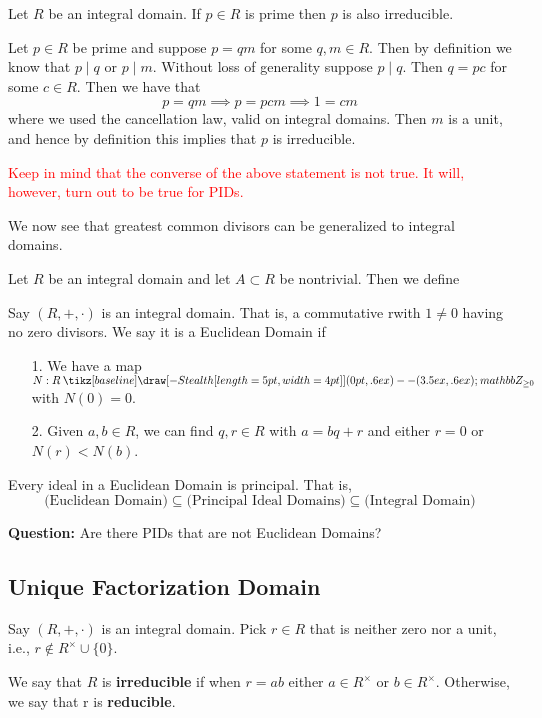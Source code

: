 \documentclass[12pt,letterpaper]{algebra_book}
\renewcommand{\to}{\mathbin{\tikz[baseline] \draw[-{Stealth[length=5pt,width=4pt]}] (0pt,.6ex) -- (3.5ex,.6ex);}}
\theoremstyle{definition}
\begin{document}
\begin{proposition}
    Let $R$ be an integral domain. If $p \in R$ is prime then $p$
    is also irreducible.
\end{proposition}

\begin{prf}
    Let $p \in R$ be prime and suppose $p = qm$ for some $q, m \in
    R$. Then by definition we know that $p \mid q$ or $p \mid m$.
    Without loss of generality suppose $p \mid q$. Then $q = pc$
    for some $c \in R$. Then we have that 
    \[
        p = qm \implies p = pcm \implies 1 = cm
    \]
    where we used the cancellation law, valid on integral domains.
    Then $m$ is a unit, and hence by definition this implies that
    $p$ is irreducible. 
\end{prf}

\textcolor{Red}{Keep in mind that the converse of the above statement
is not true. It will, however, turn out to be true for PIDs.}

We now see that greatest common divisors can be generalized to
integral domains. 

\begin{definition}
    Let $R$ be an integral domain and let $A \subset R$ be
    nontrivial. Then we define 
\end{definition}


Say $(R, +, \cdot)$ is an integral domain. That is, a commutative
rwith $1 \ne 0$ having no zero divisors. We say it is a Euclidean
Domain if 
\begin{itemize}
    \item[1.] We have a map $N: R \to mathbb{Z}_{\ge 0}$ with
    $N(0)= 0$.
    \item[2.] Given $a, b \in R$, we can find $q, r \in R$ with $a
    = bq + r$ and either  $r = 0$  or $N(r) < N(b)$. 
\end{itemize}

\begin{proposition}
    Every ideal in a Euclidean Domain is principal. That is, 
    \[
        \text{(Euclidean Domain)} \subseteq \text{(Principal Ideal Domains)} \subseteq \text{(Integral Domain)}   
    \]
\end{proposition}
\textbf{Question:} Are there PIDs that are not Euclidean Domains?

\subsection*{Unique Factorization Domain}
\begin{definition}
    Say $(R, +, \cdot)$ is an integral domain. Pick $r \in R$ that
    is neither zero nor a unit, i.e., $r \not\in
    R^{\times}\cup\{0\}$. 

    We say that $R$ is \textbf{irreducible} if when $r=ab$ either
    $a \in R^{\times}$ or $b \in R^{\times}$. Otherwise, we say
    that r is \textbf{reducible}.
\end{definition}
\end{document}
